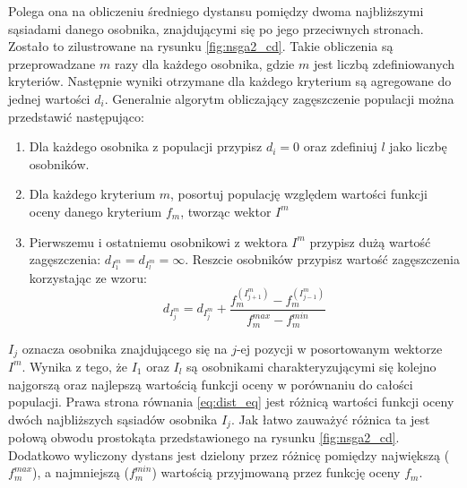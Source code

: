 \documentclass[twoside]{iisthesis}
\begin{document}
Polega ona na obliczeniu średniego dystansu pomiędzy dwoma najbliższymi sąsiadami danego osobnika, znajdującymi się po jego przeciwnych stronach. Zostało to zilustrowane na rysunku \eqref{fig:nsga2_cd}. Takie obliczenia są przeprowadzane $m$ razy dla każdego osobnika, gdzie $m$ jest liczbą zdefiniowanych kryteriów. Następnie wyniki otrzymane dla każdego kryterium są agregowane do jednej wartości $d_{i}$. Generalnie algorytm obliczający zagęszczenie populacji można przedstawić następująco:\\
\begin{enumerate}
	\item Dla każdego osobnika z populacji przypisz $d_{i} = 0$ oraz zdefiniuj $l$ jako liczbę osobników.
	\item Dla każdego kryterium $m$, posortuj populację względem wartości funkcji oceny danego kryterium $f_{m}$, tworząc wektor $I^{m}$
	\item Pierwszemu i ostatniemu osobnikowi z wektora $I^{m}$ przypisz dużą wartość zagęszczenia: $d_{I^{m}_{1}} = d_{I^{m}_{l}} = \infty$. Reszcie osobników przypisz wartość zagęszczenia korzystając ze wzoru:
	\begin{equation}\label{eq:dist_eq}
		d_{I^{m}_{j}} = d_{I^{m}_{j}} + \dfrac{f_{m}^{(I^{m}_{j+1})} - f_{m}^{(I^{m}_{j-1})}}{f^{max}_{m} - f^{min}_{m}}
	\end{equation}
\end{enumerate}
$I_{j}$ oznacza osobnika znajdującego się na $j$-ej pozycji w posortowanym wektorze $I^{m}$. Wynika z tego, że $I_{1}$ oraz $I_{l}$ są osobnikami charakteryzującymi się kolejno najgorszą oraz najlepszą wartością funkcji oceny w porównaniu do całości populacji. Prawa strona równania \eqref{eq:dist_eq} jest różnicą wartości funkcji oceny dwóch najbliższych sąsiadów osobnika $I_{j}$. Jak łatwo zauważyć różnica ta jest połową obwodu prostokąta przedstawionego na rysunku \eqref{fig:nsga2_cd}. Dodatkowo wyliczony dystans jest dzielony przez różnicę pomiędzy największą ($f^{max}_{m}$), a najmniejszą ($f^{min}_{m}$) wartością przyjmowaną przez funkcję oceny $f_{m}$. 
\end{document}
